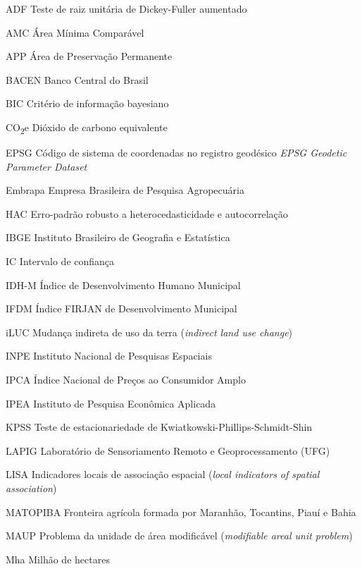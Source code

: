 \begin{siglas}
  \item[ADF] Teste de raiz unitária de Dickey-Fuller aumentado
  \item[AMC] Área Mínima Comparável
  \item[APP] Área de Preservação Permanente
  \item[BACEN] Banco Central do Brasil
  \item[BIC] Critério de informação bayesiano
  \item[CO\textsubscript{2}e] Dióxido de carbono equivalente
  \item[EPSG] Código de sistema de coordenadas no registro geodésico \emph{EPSG Geodetic Parameter Dataset}
  \item[Embrapa] Empresa Brasileira de Pesquisa Agropecuária
  \item[HAC] Erro-padrão robusto a heterocedasticidade e autocorrelação
  \item[IBGE] Instituto Brasileiro de Geografia e Estatística
  \item[IC] Intervalo de confiança
  \item[IDH-M] Índice de Desenvolvimento Humano Municipal
  \item[IFDM] Índice FIRJAN de Desenvolvimento Municipal
  \item[iLUC] Mudança indireta de uso da terra (\emph{indirect land use change})
  \item[INPE] Instituto Nacional de Pesquisas Espaciais
  \item[IPCA] Índice Nacional de Preços ao Consumidor Amplo
  \item[IPEA] Instituto de Pesquisa Econômica Aplicada
  \item[KPSS] Teste de estacionariedade de Kwiatkowski-Phillips-Schmidt-Shin
  \item[LAPIG] Laboratório de Sensoriamento Remoto e Geoprocessamento (UFG)
  \item[LISA] Indicadores locais de associação espacial (\emph{local indicators of spatial association})
  \item[MATOPIBA] Fronteira agrícola formada por Maranhão, Tocantins, Piauí e Bahia
  \item[MAUP] Problema da unidade de área modificável (\emph{modifiable areal unit problem})
  \item[Mha] Milhão de hectares

\end{siglas}
